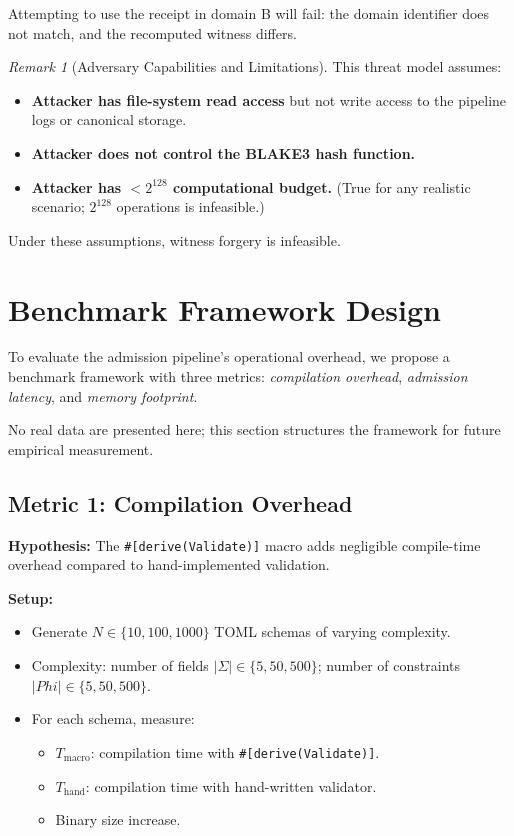 \documentclass[12pt, letterpaper]{report}
\theoremstyle{plain}
\theoremstyle{definition}
\theoremstyle{remark}
\newtheorem{remark}[theorem]{Remark}
\begin{document}
Attempting to use the receipt in domain B will fail: the domain identifier
does not match, and the recomputed witness differs.

\begin{remark}[Adversary Capabilities and Limitations]
This threat model assumes:
\begin{itemize}
  \item \textbf{Attacker has file-system read access} but not write access
        to the pipeline logs or canonical storage.
  \item \textbf{Attacker does not control the BLAKE3 hash function.}
  \item \textbf{Attacker has $< 2^{128}$ computational budget.}
        (True for any realistic scenario; $2^{128}$ operations is infeasible.)
\end{itemize}
Under these assumptions, witness forgery is infeasible.
\end{remark}

\section{Benchmark Framework Design}

To evaluate the admission pipeline's operational overhead, we propose a
benchmark framework with three metrics: \emph{compilation overhead},
\emph{admission latency}, and \emph{memory footprint}.

No real data are presented here; this section structures the framework
for future empirical measurement.

\subsection{Metric 1: Compilation Overhead}

\textbf{Hypothesis:} The \texttt{\#[derive(Validate)]} macro adds negligible
compile-time overhead compared to hand-implemented validation.

\textbf{Setup:}
\begin{itemize}
  \item Generate $N \in \{10, 100, 1000\}$ TOML schemas of varying complexity.
  \item Complexity: number of fields $|\Sigma| \in \{5, 50, 500\}$;
        number of constraints $|Phi| \in \{5, 50, 500\}$.
  \item For each schema, measure:
    \begin{itemize}
      \item $T_{\mathrm{macro}}$: compilation time with \texttt{\#[derive(Validate)]}.
      \item $T_{\mathrm{hand}}$: compilation time with hand-written validator.
      \item Binary size increase.
    \end{itemize}
\end{itemize}
\end{document}
